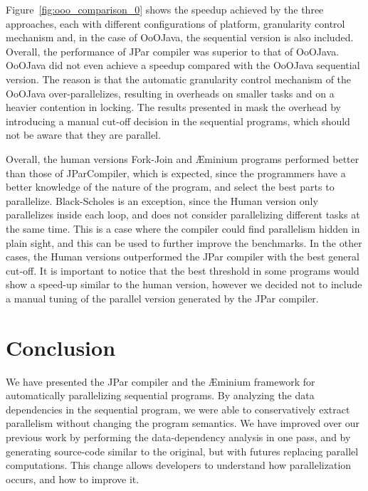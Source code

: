 \documentclass[smallextended]{svjour3}
\begin{document}


Figure~\ref{fig:ooo_comparison_0} shows the speedup achieved by the three approaches, each with different configurations of platform, granularity control mechanism and, in the case of OoOJava, the sequential version is also included. Overall, the performance of JPar compiler was superior to that of OoOJava. OoOJava did not even achieve a speedup compared with the OoOJava sequential version. The reason is that the automatic granularity control mechanism of the OoOJava over-parallelizes, resulting in overheads on smaller tasks and on a heavier contention in locking. The results presented in \cite{jenista2011ooojava} mask the overhead by introducing a manual cut-off decision in the sequential programs, which should not be aware that they are parallel.

Overall, the human versions Fork-Join and Æminium programs performed better than those of JParCompiler, which is expected, since the programmers have a better knowledge of the nature of the program, and select the best parts to parallelize. Black-Scholes is an exception, since the Human version only parallelizes inside each loop, and does not consider parallelizing different tasks at the same time. This is a case where the compiler could find parallelism hidden in plain sight, and this can be used to further improve the benchmarks. In the other cases, the Human versions outperformed the JPar compiler with the best general cut-off. It is important to notice that the best threshold in some programs would show a speed-up similar to the human version, however we decided not to include a manual tuning of the parallel version generated by the JPar compiler.

\section{Conclusion}
\label{sec:conclusion}

We have presented the JPar compiler and the Æminium framework for automatically parallelizing sequential programs. By analyzing the data dependencies in the sequential program, we were able to conservatively extract parallelism without changing the program semantics. We have improved over our previous work by performing the data-dependency analysis in one pass, and by generating source-code similar to the original, but with futures replacing parallel computations. This change allows developers to understand how parallelization occurs, and how to improve it.
\end{document}
